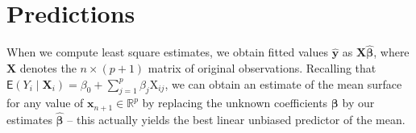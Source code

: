 \documentclass[
  11pt,
  letterpaper,
]{book}
\theoremstyle{definition}
\theoremstyle{definition}
\theoremstyle{definition}
\theoremstyle{definition}
\theoremstyle{remark}
\begin{document}
\hypertarget{predictions-lm}{%
\section{Predictions}\label{predictions-lm}}

When we compute least square estimates, we obtain fitted values \(\widehat{\boldsymbol{y}}\) as \(\mathbf{X}\widehat{\boldsymbol{\beta}}\), where \(\mathbf{X}\) denotes the \(n \times (p+1)\) matrix of original observations. Recalling that \(\mathsf{E}(Y_i \mid \mathbf{X}_i) = \beta_0 + \sum_{j=1}^p \beta_j \mathrm{X}_{ij}\), we can obtain an estimate of the mean surface for any value of \(\mathbf{x}_{n+1} \in \mathbb{R}^p\) by replacing the unknown coefficients \(\boldsymbol{\beta}\) by our estimates \(\widehat{\boldsymbol{\beta}}\) -- this actually yields the best linear unbiased predictor of the mean.
\end{document}
